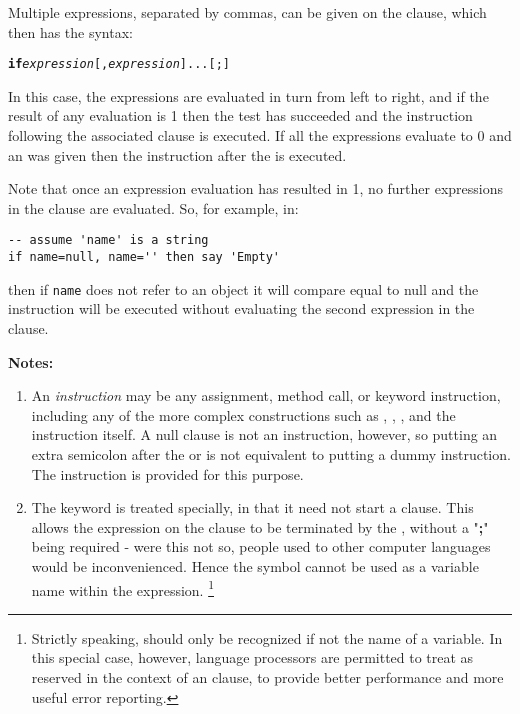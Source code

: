 Multiple expressions, separated by commas, can be given on the
 clause, which then has the syntax:
\begin{shaded}
\begin{alltt}
\textbf{if} \emph{expression}[, \emph{expression}]... [;]
\end{alltt}
\end{shaded}
In this case, the expressions are evaluated in turn from left to
right, and if the result of any evaluation is 1 then the test has
succeeded and the instruction following the associated 
clause is executed.
If all the expressions evaluate to 0 and an  was given
then the instruction after the  is executed.
 
Note that once an expression evaluation has resulted in 1, no further
expressions in the clause are evaluated.  So, for example, in:
\begin{lstlisting}
-- assume 'name' is a string
if name=null, name='' then say 'Empty'
\end{lstlisting}
then if \texttt{name} does not refer to an object it will compare equal to
null and the  instruction will be executed without
evaluating the second expression in the  clause.
\begin{shaded}\noindent
\textbf{Notes:}
\begin{enumerate}
\item An \emph{instruction} may be any assignment, method call, or
keyword instruction, including any of the more complex constructions
such as , , , and the 
instruction itself.
A null clause is not an instruction, however, so putting an extra
semicolon after the  or  is not equivalent to
putting a dummy instruction.
The  instruction is provided for this purpose.
\item The keyword  is treated specially, in that it need not start a
clause.
This allows the expression on the  clause to be terminated by
the , without a "\textbf{;}" being required -
were this not so, people used to other computer languages would
be inconvenienced.
Hence the symbol  cannot be used as a variable name within
the expression.
\footnote{
Strictly speaking,  should only be recognized if not
the name of a variable.  In this special case, however, \nr{} language
processors are permitted to treat  as reserved in the
context of an  clause, to provide better performance and
more useful error reporting.
}
\end{enumerate}
\end{shaded}\indent
